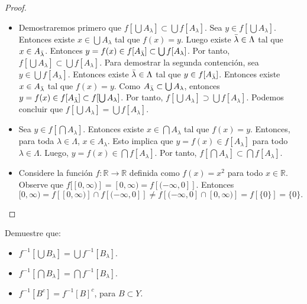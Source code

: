\documentclass[12pt]{article}
\newcommand{\R}{\mathbb{R}}
\newenvironment{problem}[2][Problema]{\begin{trivlist}
\item[\hskip \labelsep {\bfseries #1}\hskip \labelsep {\bfseries #2.}]}{\end{trivlist}}
\begin{document}
\begin{proof}
\text{ }
\begin{itemize}
    \item[a)] Demostraremos primero que $f[\bigcup A_\lambda ] \subset \bigcup f[A_\lambda]$. Sea $y \in f[\bigcup A_\lambda ]$. Entonces existe $x \in \bigcup A_\lambda $ tal que $f(x) = y$. Luego existe $\Bar{\lambda}  \in \Lambda$ tal que $x \in A_{ \Bar{\lambda}}$. Entonces $y = f(x) \in f[A_{\Bar{\lambda}}] \subset \bigcup f[A_\lambda]$. Por tanto, $f[\bigcup A_\lambda ] \subset \bigcup f[A_\lambda]$. Para demostrar la segunda contención, sea $y\in \bigcup f[A_\lambda]$. Entonces existe $\Bar{\lambda} \in \Lambda$ tal que $y \in f[A_{\Bar{\lambda}}]$. Entonces existe $x \in A_{\Bar{\lambda}}$ tal que $f(x) = y$. Como $A_{\Bar{\lambda}} \subset \bigcup A_\lambda $, entonces  $ y = f(x) \in f[A_{\Bar{\lambda}}] \subset f[\bigcup A_\lambda]$. Por tanto, $f[\bigcup A_\lambda ] \supset \bigcup f[A_\lambda]$. Podemos concluir que $f[\bigcup A_\lambda ] = \bigcup f[A_\lambda]$.
    
    \item[b)] Sea $y \in f[\bigcap A_\lambda ]$. Entonces existe $x \in \bigcap A_\lambda $ tal que $f(x) = y$. Entonces, para toda $\lambda \in \Lambda$, $x \in A_\lambda$. Esto implica que $y = f(x) \in f[A_\lambda]$ para todo $\lambda \in \Lambda$. Luego, $y = f(x) \in \bigcap f[A_\lambda]$. Por tanto, $f[\bigcap A_\lambda ] \subset \bigcap f[A_\lambda]$. 
    
    \item[c)] Considere la función $f: \R \rightarrow \R$ definida como $f(x) = x^2$ para todo $x \in \R$. Observe que $f[[0, \infty)] = [0, \infty) = f[(-\infty, 0]]$. Entonces $[0, \infty) = f[[0, \infty)] \cap f[(-\infty, 0]] \neq f[(-\infty, 0] \cap [0, \infty) ] = f[\{0\}] =  \{0\}.$
\end{itemize}
\end{proof}
\text{ }

\begin{problem}{17} Demuestre que:
\begin{itemize}
    \item [a)] $f^{-1}[\bigcup B_\lambda ] = \bigcup f^{-1}[B_\lambda]$.
    \item [b)] $f^{-1}[\bigcap B_\lambda ] = \bigcap f^{-1}[B_\lambda]$.
    \item[c)] $f^{-1}[B^c] = f^{-1}[B]^c$, para $B \subset Y$. 
\end{itemize}

\end{problem}
\end{document}
